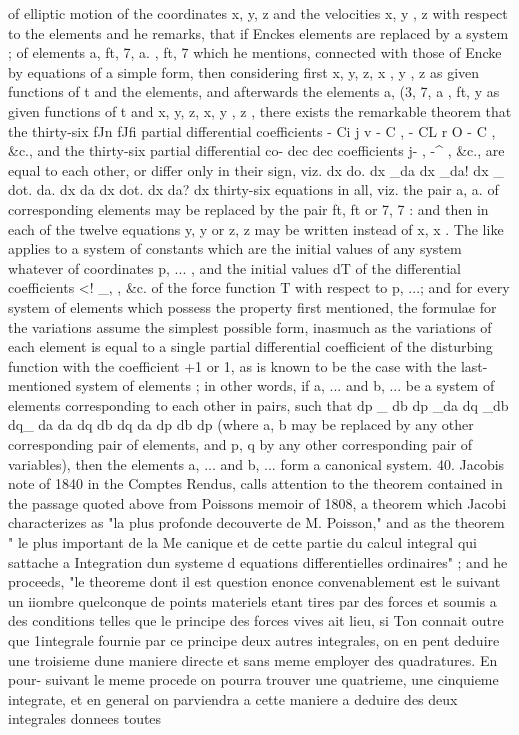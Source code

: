 \documentclass[11pt,a4paper]{book}
\begin{document}
of elliptic motion of the coordinates x, y, z and the velocities x, y , z with respect
to the elements and he remarks, that if Enckes elements are replaced by a system
;
of elements a, ft, 7, a. , ft, 7 which he mentions, connected with those of Encke by
equations of a simple form, then considering first x, y, z, x , y , z as given functions
of t and the elements, and afterwards the elements a, (3, 7, a , ft, y as given functions
of t and x, y, z, x, y , z , there exists the remarkable theorem that the thirty-six
fJn fJfi
partial differential coefficients - Ci j v - C , - CL r O - C , &c., and the thirty-six partial differential co-
dec dec
coefficients j- , -^ , &c., are equal to each other, or differ only in their sign, viz.
dx do. dx _da dx _da! dx _ dot.
da. dx da dx dot. dx da? dx
thirty-six equations in all, viz. the pair a, a. of corresponding elements may be replaced
by the pair ft, ft or 7, 7 : and then in each of the twelve equations y, y or z, z
may be written instead of x, x . The like applies to a system of constants which are
the initial values of any system whatever of coordinates p, ... , and the initial values
dT
of the differential coefficients <! _, , &c. of the force function T with respect to p, ...;
and for every system of elements which possess the property first mentioned, the formulae
for the variations assume the simplest possible form, inasmuch as the variations of each
element is equal to a single partial differential coefficient of the disturbing function with
the coefficient +1 or 1, as is known to be the case with the last-mentioned system of
elements ; in other words, if a, ... and b, ... be a system of elements corresponding
to each other in pairs, such that
dp _ db dp _da dq _db dq_ da
da dq db dq da dp db dp
(where a, b may be replaced by any other corresponding pair of elements, and p, q by
any other corresponding pair of variables), then the elements a, ... and b, ... form a
canonical system.
40. Jacobis note of 1840 in the Comptes Rendus, calls attention to the theorem
contained in the passage quoted above from Poissons memoir of 1808, a theorem
which Jacobi characterizes as "la plus profonde decouverte de M. Poisson," and as the
theorem " le plus important de la Me canique et de cette partie du calcul integral
qui sattache a Integration dun systeme d equations differentielles ordinaires" ; and he
proceeds, "le theoreme dont il est question enonce convenablement est le suivant un
iiombre quelconque de points materiels etant tires par des forces et soumis a des
conditions telles que le principe des forces vives ait lieu, si Ton connait outre que
1integrale fournie par ce principe deux autres integrales, on en pent deduire une
troisieme dune maniere directe et sans meme employer des quadratures. En pour-
suivant le meme procede on pourra trouver une quatrieme, une cinquieme integrate, et
en general on parviendra a cette maniere a deduire des deux integrales donnees toutes
\end{document}
